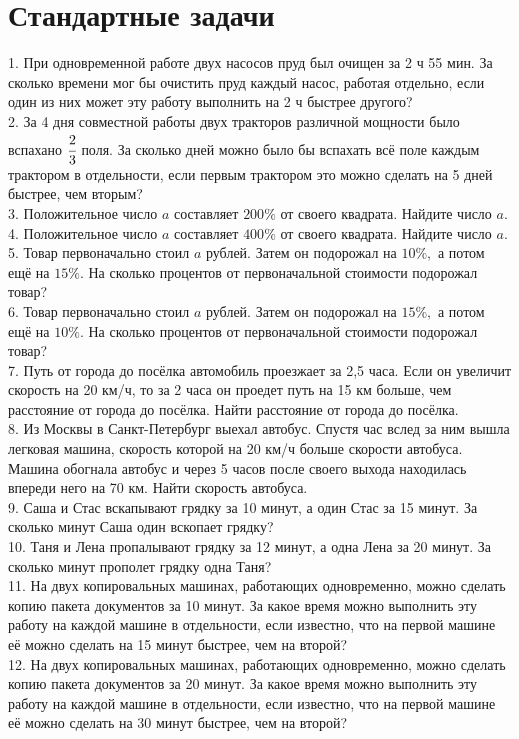 \documentclass[12pt]{article}
\begin{document}
\section{Стандартные задачи}
1. При одновременной работе двух насосов пруд был очищен за 2 ч 55 мин. За сколько времени мог бы очистить пруд каждый насос, работая отдельно, если один из них может эту работу выполнить на 2 ч быстрее другого?\\
2. За 4 дня совместной работы двух тракторов различной мощности было вспахано $\cfrac{2}{3}$ поля. За сколько дней можно было бы вспахать всё поле каждым трактором в отдельности, если первым трактором это можно сделать на 5 дней быстрее, чем вторым?\\
3. Положительное число $a$ составляет $200\%$ от своего квадрата. Найдите число $a.$\\
4. Положительное число $a$ составляет $400\%$ от своего квадрата. Найдите число $a.$\\
5. Товар первоначально стоил $a$ рублей. Затем он подорожал на $10\%,$ а потом ещё на $15\%.$ На сколько процентов от первоначальной стоимости подорожал товар?\\
6. Товар первоначально стоил $a$ рублей. Затем он подорожал на $15\%,$ а потом ещё на $10\%.$ На сколько процентов от первоначальной стоимости подорожал товар?\\
7. Путь от города до посёлка автомобиль проезжает за 2,5 часа. Если он увеличит скорость на 20 км/ч, то за 2 часа он проедет путь на 15 км больше, чем расстояние от города до посёлка. Найти расстояние от города до посёлка.\\
8. Из Москвы в Санкт-Петербург выехал автобус. Спустя час вслед за ним вышла
легковая машина, скорость которой на 20 км/ч больше скорости автобуса. Машина обогнала автобус и через 5 часов после своего выхода находилась впереди него на 70 км. Найти скорость автобуса.\\
9. Саша и Стас вскапывают грядку за 10 минут, а один Стас за 15 минут. За сколько минут Саша один вскопает грядку?\\
10. Таня и Лена пропалывают грядку за 12 минут, а одна Лена за 20 минут. За сколько минут прополет грядку одна Таня?\\
11. На двух копировальных машинах, работающих одновременно, можно сделать копию пакета документов за 10 минут. За какое время можно выполнить эту работу на каждой машине в отдельности, если известно, что на первой машине её можно сделать на 15 минут быстрее, чем на второй?\\
12. На двух копировальных машинах, работающих одновременно, можно сделать копию пакета документов за 20 минут. За какое время можно выполнить эту работу на каждой машине в отдельности, если известно, что на первой машине её можно сделать на 30 минут быстрее, чем на второй?\\
\end{document}
